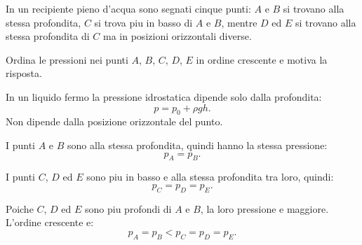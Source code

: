 
\begin{esercizio}
In un recipiente pieno d'acqua sono segnati cinque punti: $A$ e $B$ si trovano
alla stessa profondita, $C$ si trova piu in basso di $A$ e $B$, mentre $D$ ed
$E$ si trovano alla stessa profondita di $C$ ma in posizioni orizzontali
diverse.

Ordina le pressioni nei punti $A$, $B$, $C$, $D$, $E$ in ordine crescente e
motiva la risposta.
\end{esercizio}

\begin{soluzione}
In un liquido fermo la pressione idrostatica dipende solo dalla profondita:
\[
p=p_0+\rho gh.
\]
Non dipende dalla posizione orizzontale del punto.

I punti \(A\) e \(B\) sono alla stessa profondita, quindi hanno la stessa
pressione:
\[
p_A=p_B.
\]

I punti \(C\), \(D\) ed \(E\) sono piu in basso e alla stessa profondita tra
loro, quindi:
\[
p_C=p_D=p_E.
\]

Poiche \(C\), \(D\) ed \(E\) sono piu profondi di \(A\) e \(B\), la loro
pressione e maggiore. L'ordine crescente e:
\[
p_A=p_B < p_C=p_D=p_E.
\]
\end{soluzione}
